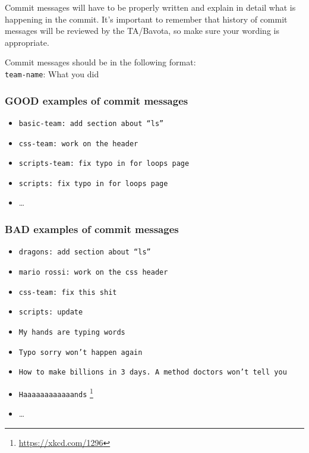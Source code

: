 \documentclass[hidelinks,12pt,a4paper,numbers=enddot]{scrartcl}
\begin{document}
Commit messages will have to be properly written and explain in detail
what is happening in the commit. It's important to remember that history of commit messages will be reviewed by the TA/Bavota, so make sure your wording is appropriate.

Commit messages should be in the following format:\\

\texttt{team-name}: What you did

\subsubsection{GOOD examples of commit messages}

\begin{itemize}
\item \texttt{basic-team: add section about ``ls''}
\item \texttt{css-team: work on the header}
\item \texttt{scripts-team: fix typo in for loops page}
\item \texttt{scripts: fix typo in for loops page}
\item \ldots
\end{itemize}

\subsubsection{BAD examples of commit messages}

\begin{itemize}
\item \texttt{dragons: add section about ``ls''}
\item \texttt{mario rossi: work on the css header}
\item \texttt{css-team: fix this shit}
\item \texttt{scripts: update}
\item \texttt{My hands are typing words}
\item \texttt{Typo sorry won't happen again}
\item \texttt{How to make billions in 3 days. A method doctors won't tell you}
\item \texttt{Haaaaaaaaaaaands} \footnote{\url{https://xkcd.com/1296}}
\item \ldots
\end{itemize}
\end{document}
